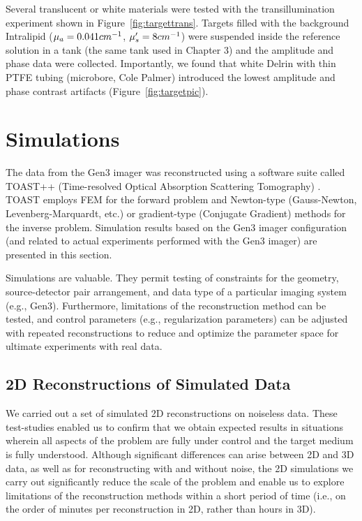 %
Several translucent or white materials were tested with the transillumination experiment shown in Figure~\ref{fig:targettrans}. Targets filled with the background Intralipid ($\mu_a=0.041 cm^{-1}$, $\mu_s^{\prime}=8 cm^{-1}$) were suspended inside the reference solution in a tank (the same tank used in Chapter 3) and the amplitude and phase data were collected. Importantly, we found that white Delrin with thin PTFE tubing (microbore, Cole Palmer) introduced the lowest amplitude and phase contrast artifacts (Figure~\ref{fig:targetpic}).
\floatbarrier
\section{Simulations}
The data from the Gen3 imager was reconstructed using a software suite called TOAST++ (Time-resolved Optical Absorption Scattering Tomography) \cite{Schweiger2014}. TOAST employs FEM for the forward problem and Newton-type (Gauss-Newton, Levenberg-Marquardt, etc.) or gradient-type (Conjugate Gradient) methods for the inverse problem. Simulation results based on the Gen3 imager configuration (and related to actual experiments performed with the Gen3 imager) are presented in this section.

Simulations are valuable. They permit testing of constraints for the geometry, source-detector pair arrangement, and data type of a particular imaging system (e.g., Gen3). Furthermore, limitations of the reconstruction method can be tested, and control parameters (e.g., regularization parameters) can be adjusted with repeated reconstructions to reduce and optimize the parameter space for ultimate experiments with real data.

\subsection{2D Reconstructions of Simulated Data}
\label{sec:2Dsim}
We carried out a set of simulated 2D reconstructions on noiseless data.  These test-studies enabled us to confirm that we obtain expected results in situations wherein all aspects of the problem are fully under control and the target medium is fully understood. Although significant differences can arise between 2D and 3D data, as well as for reconstructing with and without noise, the 2D simulations we carry out significantly reduce the scale of the problem and enable us to explore limitations of the reconstruction methods within a short period of time (i.e., on the order of minutes per reconstruction in 2D, rather than hours in 3D).

